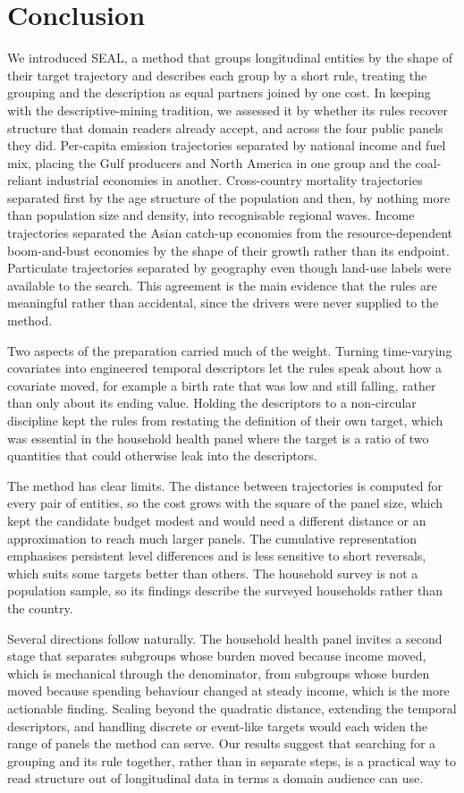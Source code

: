 \section{Conclusion}
\label{sec:conclusion}

We introduced SEAL, a method that groups longitudinal entities by the shape of their target trajectory and describes each group by a short rule, treating the grouping and the description as equal partners joined by one cost. In keeping with the descriptive-mining tradition, we assessed it by whether its rules recover structure that domain readers already accept, and across the four public panels they did. Per-capita emission trajectories separated by national income and fuel mix, placing the Gulf producers and North America in one group and the coal-reliant industrial economies in another. Cross-country mortality trajectories separated first by the age structure of the population and then, by nothing more than population size and density, into recognisable regional waves. Income trajectories separated the Asian catch-up economies from the resource-dependent boom-and-bust economies by the shape of their growth rather than its endpoint. Particulate trajectories separated by geography even though land-use labels were available to the search. This agreement is the main evidence that the rules are meaningful rather than accidental, since the drivers were never supplied to the method.

Two aspects of the preparation carried much of the weight. Turning time-varying covariates into engineered temporal descriptors let the rules speak about how a covariate moved, for example a birth rate that was low and still falling, rather than only about its ending value. Holding the descriptors to a non-circular discipline kept the rules from restating the definition of their own target, which was essential in the household health panel where the target is a ratio of two quantities that could otherwise leak into the descriptors.

The method has clear limits. The distance between trajectories is computed for every pair of entities, so the cost grows with the square of the panel size, which kept the candidate budget modest and would need a different distance or an approximation to reach much larger panels. The cumulative representation emphasises persistent level differences and is less sensitive to short reversals, which suits some targets better than others. The household survey is not a population sample, so its findings describe the surveyed households rather than the country.

Several directions follow naturally. The household health panel invites a second stage that separates subgroups whose burden moved because income moved, which is mechanical through the denominator, from subgroups whose burden moved because spending behaviour changed at steady income, which is the more actionable finding. Scaling beyond the quadratic distance, extending the temporal descriptors, and handling discrete or event-like targets would each widen the range of panels the method can serve. Our results suggest that searching for a grouping and its rule together, rather than in separate steps, is a practical way to read structure out of longitudinal data in terms a domain audience can use.
